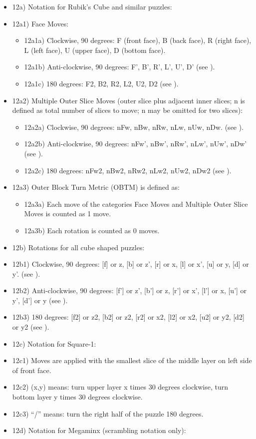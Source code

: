 \begin{itemize}
\item
  12a) Notation for Rubik's Cube and similar puzzles:
\item
  12a1) Face Moves:

  \begin{itemize}
  \item
    12a1a) Clockwise, 90 degrees: F (front face), B (back face), R
    (right face), L (left face), U (upper face), D (bottom face).
  \item
    12a1b) Anti-clockwise, 90 degrees: F', B', R', L', U', D' (see ).
  \item
    12a1c) 180 degrees: F2, B2, R2, L2, U2, D2 (see ).
  \end{itemize}
\item
  12a2) Multiple Outer Slice Moves (outer slice plus adjacent inner
  slices; n is defined as total number of slices to move; n may be
  omitted for two slices):

  \begin{itemize}
  \item
    12a2a) Clockwise, 90 degrees: nFw, nBw, nRw, nLw, nUw, nDw. (see ).
  \item
    12a2b) Anti-clockwise, 90 degrees: nFw', nBw', nRw', nLw', nUw',
    nDw' (see ).
  \item
    12a2c) 180 degrees: nFw2, nBw2, nRw2, nLw2, nUw2, nDw2 (see ).
  \end{itemize}
\item
  12a3) Outer Block Turn Metric (OBTM) is defined as:

  \begin{itemize}
  \item
    12a3a) Each move of the categories Face Moves and Multiple Outer
    Slice Moves is counted as 1 move.
  \item
    12a3b) Each rotation is counted as 0 moves.
  \end{itemize}
\item
  12b) Rotations for all cube shaped puzzles:
\item
  12b1) Clockwise, 90 degrees: {[}f{]} or z, {[}b{]} or z', {[}r{]} or
  x, {[}l{]} or x', {[}u{]} or y, {[}d{]} or y'. (see ).
\item
  12b2) Anti-clockwise, 90 degrees: {[}f'{]} or z', {[}b'{]} or z,
  {[}r'{]} or x', {[}l'{]} or x, {[}u'{]} or y', {[}d'{]} or y (see ).
\item
  12b3) 180 degrees: {[}f2{]} or z2, {[}b2{]} or z2, {[}r2{]} or x2,
  {[}l2{]} or x2, {[}u2{]} or y2, {[}d2{]} or y2 (see ).
\item
  12c) Notation for Square-1:
\item
  12c1) Moves are applied with the smallest slice of the middle layer on
  left side of front face.
\item
  12c2) (x,y) means: turn upper layer x times 30 degrees clockwise, turn
  bottom layer y times 30 degrees clockwise.
\item
  12c3) ``/'' means: turn the right half of the puzzle 180 degrees.
\item
  12d) Notation for Megaminx (scrambling notation only):


\end{itemize}
